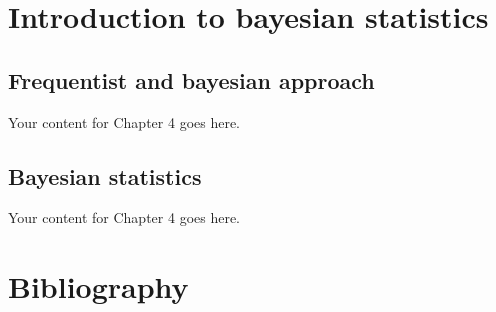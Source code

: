 \documentclass{book}
\begin{document}
\chapter{Introduction to bayesian statistics}

\section{Frequentist and bayesian approach}
Your content for Chapter 4 goes here.

\section{Bayesian statistics}
Your content for Chapter 4 goes here.

\backmatter

\chapter*{Bibliography}
\end{document}
